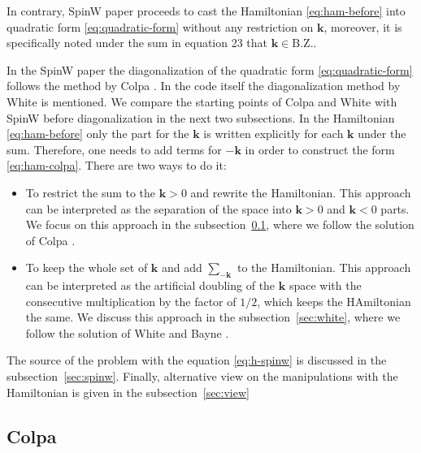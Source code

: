 \documentclass[a4paper,12pt]{article}
\begin{document}
        In contrary, SpinW paper \cite{toth2015linear} proceeds to cast the Hamiltonian \eqref{eq:ham-before} into quadratic form \eqref{eq:quadratic-form} without any restriction on $\boldsymbol{k}$,
        moreover, it is specifically noted under the sum in equation 23 that $\boldsymbol{k} \in \text{B.Z.}$.

        In the SpinW paper the diagonalization of the quadratic form \eqref{eq:quadratic-form} follows the method by Colpa \cite{colpa1978diagonalization}. 
        In the code itself the diagonalization method by White \cite{white1965diagonalization} is mentioned.
        We compare the starting points of Colpa and White with SpinW before diagonalization in the next two subsections. 
        In the Hamiltonian \eqref{eq:ham-before} only the part for the $\boldsymbol{k}$ is written explicitly for each $\boldsymbol{k}$ under the sum. 
        Therefore, one needs to add terms for $-\boldsymbol{k}$ in order to construct the form \eqref{eq:ham-colpa}. 
        There are two ways to do it:

        \begin{itemize}
            \item To restrict the sum to the $\boldsymbol{k} > 0$ and rewrite the Hamiltonian. 
            This approach can be interpreted as the separation of the space into $\boldsymbol{k} > 0$ and $\boldsymbol{k} < 0$ parts. 
            We focus on this approach in the subsection~\ref{sec:colpa}, where we follow the solution of Colpa \cite{colpa1978diagonalization}.

            \item To keep the whole set of $\boldsymbol{k}$ and add $\sum_{-\boldsymbol{k}}$ to the Hamiltonian.
            This approach can be interpreted as the artificial doubling of the $\boldsymbol{k}$ space 
            with the consecutive multiplication by the factor of $1/2$, which keeps the HAmiltonian the same. 
            We discuss this approach in the subsection~\ref{sec:white}, where we follow the solution of White and Bayne \cite{white1983quantum}.
        \end{itemize}

        The source of the problem with the equation \eqref{eq:h-spinw} is discussed in the subsection~\ref{sec:spinw}. 
        Finally, alternative view on the manipulations with the Hamiltonian is given in the subsection~\ref{sec:view}
        
        \subsection{Colpa \cite{colpa1978diagonalization}}\label{sec:colpa}
        
\end{document}
